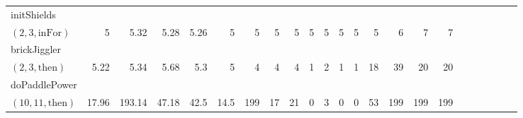 \documentclass[sigconf]{acmart}
\newcommand{\thenBr}{\text{then}}
\newcommand{\elseBr}{\text{else}}
\newcommand{\inFor}{\text{inFor}}
\begin{document}
\begin{table*}
{\begin{tabular}{l|rrrr|rrrr|rrrr|rrrr|r|r|r|r|r|r}
    \midrule
    \midrule
    initShields       &             &             &                &               &       &       &         &         &          &          &            &             &          &         &            & & & & & & &\\
    $(2,3,\inFor)$    & 5           & 5.32        & 5.28           & 5.26          & 5     & 5     & 5       & 5       & 5        & 5        & 5          & 5           & 5        & 6       & 7          & 7 & & & & & & \\
    \midrule
    \midrule
    brickJiggler      &             &             &                &               &       &       &         &         &          &          &            &             &          &         &            & & & & & & &\\
    $(2,3,\thenBr)$   & 5.22        & 5.34        & 5.68           & 5.3           & 5     & 4     & 4       & 4       & 1        & 2        & 1          & 1           & 18       & 39      & 20         & 20 & & & & & & \\
    doPaddlePower     &             &             &                &               &       &       &         &         &          &          &            &             &          &         &            & & & & & & & \\
    $(10,11,\thenBr)$ & 17.96       & 193.14      & 47.18          & 42.5          & 14.5  & 199   & 17      & 21      & 0        & 3        & 0          & 0           & 53       & 199     & 199        & 199 & & & & & & \\

\end{tabular}}
\end{table*}
\end{document}
